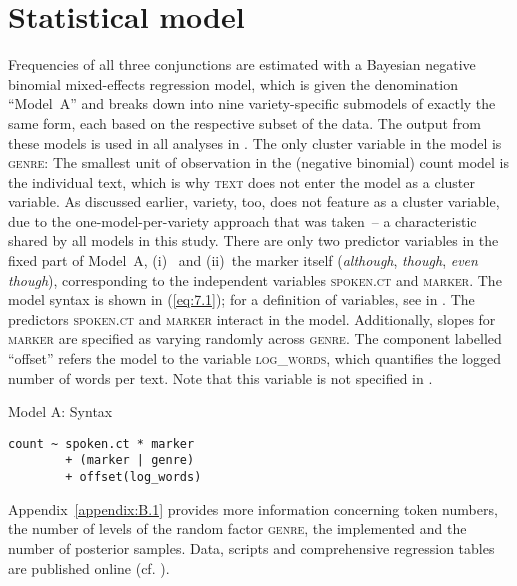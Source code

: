 \section{\label{bkm:Ref52283842}Statistical model}\label{sec:7.2}
\begin{sloppypar}
Frequencies of all three conjunctions are estimated with a Bayesian negative binomial mixed-effects regression model, which is given the denomination “Model~A” and breaks down into nine variety-specific submodels of exactly the same form, each based on the respective subset of the data. The output from these models is used in all analyses in . The only cluster variable in the model is \textsc{genre}: The smallest unit of observation in the (negative binomial) count model is the individual text, which is why \textsc{text} does not enter the model as a cluster variable. As discussed earlier, variety, too, does not feature as a cluster variable, due to the one-model-per-variety approach that was taken~– a characteristic shared by all models in this study. There are only two predictor variables in the fixed part of Model~A,
(i)~ and
(ii)~the marker itself (\textit{although}, \textit{though}, \textit{even though}), corresponding to the independent variables \textsc{spoken.ct} and \textsc{marker}. The model syntax is shown in (\ref{eq:7.1}); for a definition of variables, see  in . The predictors \textsc{spoken.ct} and \textsc{marker} interact in the model. Additionally, slopes for \textsc{marker} are specified as varying randomly across \textsc{genre}. The component labelled “offset” refers the model to the variable \textsc{log\_words}, which quantifies the logged number of words per text. Note that this variable is not specified in .
\end{sloppypar}

\ea
\label{bkm:Ref41307899}\label{eq:7.1}Model A: Syntax
\begin{lstlisting}
count ~ spoken.ct * marker
        + (marker | genre)
        + offset(log_words)
\end{lstlisting}
\z

Appendix~\ref{appendix:B.1} provides more information concerning token numbers, the number of levels of the random factor \textsc{genre}, the implemented  and the number of posterior samples. Data, scripts and comprehensive regression tables are published online (cf. ).

